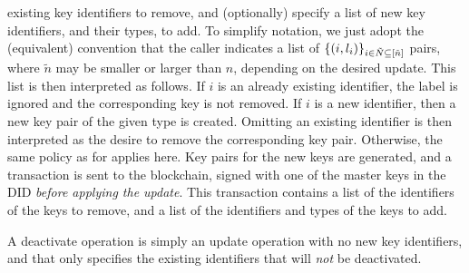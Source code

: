 \begin{description}
  existing key identifiers to remove, and (optionally) specify a list of new key
  identifiers, and their types, to add. To simplify notation, we just adopt the
  (equivalent) convention that the caller indicates a list of $\lbrace (i,
  l_i) \rbrace_{i\in\tilde{N}\subseteq[\tilde{n}]}$ pairs, where $\tilde{n}$
  may be smaller or larger than $n$, depending on the desired update. This
  list is then interpreted as follows. If $i$ is an already existing
  identifier, the label is ignored and the corresponding key is not removed. If
  $i$ is a new identifier, then a new key pair of the given type is created.
  Omitting an existing identifier is then interpreted as the desire to remove
  the corresponding key pair. Otherwise, the same policy as for 
  applies here. Key pairs for the new keys are generated, and a transaction is
  sent to the blockchain, signed with one of the master keys in the DID
  \emph{before applying the update}. This transaction contains a list of the
  identifiers of the keys to remove, and a list of the identifiers and types
  of the keys to add.
\item[\uccmd{Deactivate}.] %
  A deactivate operation is simply an update operation with no new key
  identifiers, and that only specifies the existing identifiers that will
  \emph{not} be deactivated.
\end{description}

